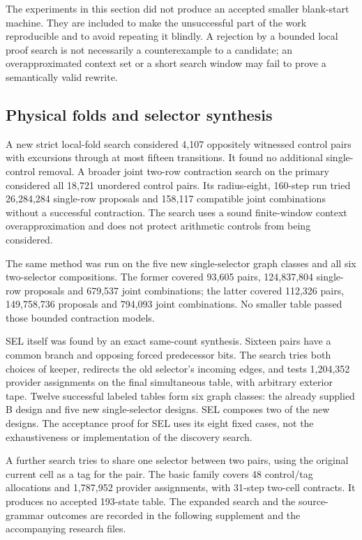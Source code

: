 \documentclass[10pt,letterpaper]{article}
\begin{document}
The experiments in this section did not produce an accepted smaller
blank-start machine. They are included to make the unsuccessful part of
the work reproducible and to avoid repeating it blindly. A rejection by
a bounded local proof search is not necessarily a counterexample to a
candidate; an overapproximated context set or a short search window may
fail to prove a semantically valid rewrite.

\subsection{Physical folds and selector synthesis}

A new strict local-fold search considered 4,107 oppositely witnessed
control pairs with excursions through at most fifteen transitions. It
found no additional single-control removal. A broader joint two-row
contraction search on the primary considered all 18,721 unordered control
pairs. Its radius-eight, 160-step run tried 26,284,284 single-row proposals
and 158,117 compatible joint combinations without a successful contraction.
The search uses a sound finite-window context overapproximation and does
not protect arithmetic controls from being considered.

The same method was run on the five new single-selector graph classes
and all six two-selector compositions. The former covered 93,605 pairs,
124,837,804 single-row proposals and 679,537 joint combinations; the latter
covered 112,326 pairs, 149,758,736 proposals and 794,093 joint combinations.
No smaller table passed those bounded contraction models.

SEL itself was found by an exact same-count synthesis. Sixteen pairs
have a common branch and opposing forced predecessor bits. The search
tries both choices of keeper, redirects the old selector's incoming
edges, and tests 1,204,352 provider assignments on the final simultaneous
table, with arbitrary exterior tape. Twelve successful labeled tables
form six graph classes: the already supplied B design and five new
single-selector designs. SEL composes two of the new designs. The
acceptance proof for SEL uses its eight fixed cases, not the exhaustiveness
or implementation of the discovery search.

A further search tries to share one selector between two pairs, using
the original current cell as a tag for the pair. The basic family covers
48 control/tag allocations and 1,787,952 provider assignments, with
31-step two-cell contracts. It produces no accepted 193-state table.
The expanded search and the source-grammar outcomes are recorded in the
following supplement and the accompanying research files.


\end{document}
